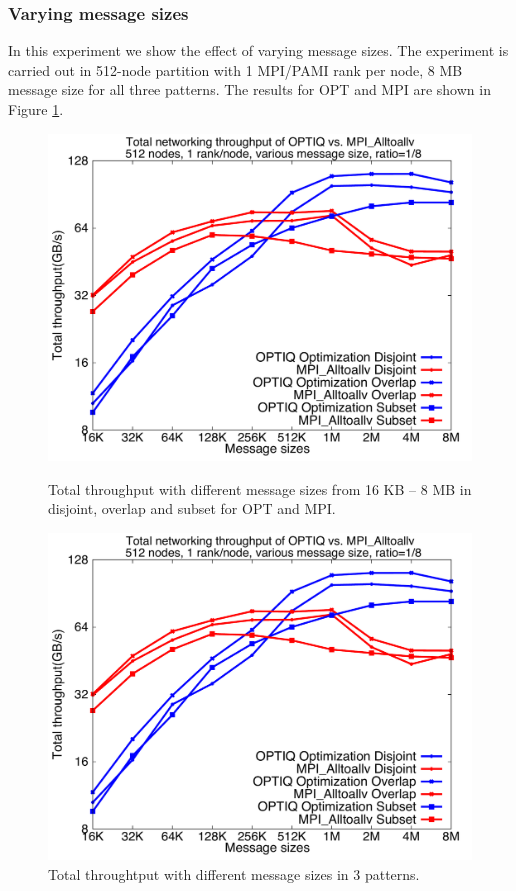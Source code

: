 \subsubsection{Varying message sizes}

In this experiment we show the effect of varying message sizes. The experiment is carried out in 512-node partition with 1 MPI/PAMI rank per node, 8 MB message size for all three patterns. The results for OPT and MPI are shown in Figure \ref{fig:messagesize}.
\begin{figure}[!htb]
\vspace{-0.15in}
\centering
\includegraphics[scale=0.30]{figures/messagesize.pdf}
\vspace{-0.1in}
\caption{Total throughput with different message sizes from 16 KB -- 8 MB in disjoint, overlap and subset for OPT and MPI.}
\vspace{-0.1in}
\includegraphics[scale=0.27]{figures/messagesize.pdf}
\vspace{-0.15in}
\caption{Total throughtput with different message sizes in 3 patterns.}
\vspace{-0.15in}
\label{fig:messagesize}
\end{figure}
